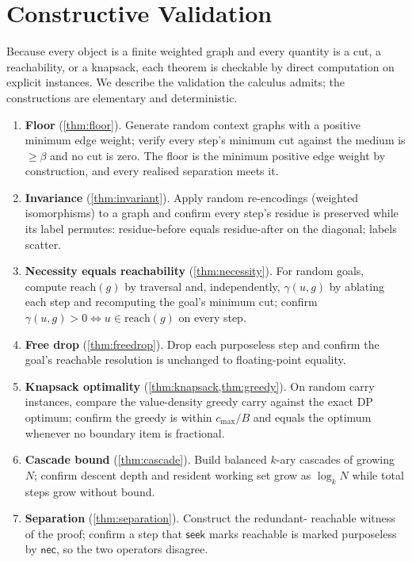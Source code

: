\documentclass[11pt,twocolumn,a4paper]{article}
\theoremstyle{thmstyle}
\theoremstyle{definition}
\theoremstyle{remark}
\newcommand{\flo}{\beta}                %
\newcommand{\goal}{g}                   %
\newcommand{\reach}{\mathrm{reach}}
\newcommand{\contrib}{\gamma}           %
\newcommand{\budget}{B}
\newcommand{\seek}{\textsf{seek}}
\newcommand{\nec}{\textsf{nec}}
\newcommand{\cost}{c}                   %
\begin{document}
\section{Constructive Validation}
\label{sec:validation}

Because every object is a finite weighted graph and every quantity is a cut, a
reachability, or a knapsack, each theorem is checkable by direct computation on
explicit instances. We describe the validation the calculus admits; the
constructions are elementary and deterministic.

\begin{enumerate}[leftmargin=1.6em,itemsep=3pt]
\item \textbf{Floor} (\cref{thm:floor}). Generate random context graphs with a
positive minimum edge weight; verify every step's minimum cut against the medium
is $\ge\flo$ and no cut is zero. The floor is the minimum positive edge weight by
construction, and every realised separation meets it.
\item \textbf{Invariance} (\cref{thm:invariant}). Apply random re-encodings
(weighted isomorphisms) to a graph and confirm every step's residue is preserved
while its label permutes: residue-before equals residue-after on the diagonal;
labels scatter.
\item \textbf{Necessity equals reachability} (\cref{thm:necessity}). For random
goals, compute $\reach(\goal)$ by traversal and, independently,
$\contrib(u,\goal)$ by ablating each step and recomputing the goal's minimum cut;
confirm $\contrib(u,\goal)>0\iff u\in\reach(\goal)$ on every step.
\item \textbf{Free drop} (\cref{thm:freedrop}). Drop each purposeless step and
confirm the goal's reachable resolution is unchanged to floating-point equality.
\item \textbf{Knapsack optimality} (\cref{thm:knapsack,thm:greedy}). On random
carry instances, compare the value-density greedy carry against the exact DP
optimum; confirm the greedy is within $\cost_{\max}/\budget$ and equals the
optimum whenever no boundary item is fractional.
\item \textbf{Cascade bound} (\cref{thm:cascade}). Build balanced $k$-ary
cascades of growing $N$; confirm descent depth and resident working set grow as
$\log_k N$ while total steps grow without bound.
\item \textbf{Separation} (\cref{thm:separation}). Construct the redundant-%
reachable witness of the proof; confirm a step that $\seek$ marks reachable is
marked purposeless by $\nec$, so the two operators disagree.
\end{enumerate}
\end{document}
